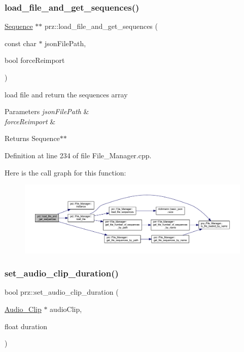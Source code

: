 \subsubsection{\texorpdfstring{load\_file\_and\_get\_sequences()}{load\_file\_and\_get\_sequences()}}
{\footnotesize\ttfamily \mbox{\hyperlink{classprz_1_1_sequence}{Sequence}} $\ast$$\ast$ prz\+::load\+\_\+file\+\_\+and\+\_\+get\+\_\+sequences (\begin{DoxyParamCaption}\item[{const char $\ast$}]{json\+File\+Path,  }\item[{bool}]{force\+Reimport }\end{DoxyParamCaption})}



load file and return the sequences array 


\begin{DoxyParams}{Parameters}
{\em json\+File\+Path} & \\
\hline
{\em force\+Reimport} & \\
\hline
\end{DoxyParams}
\begin{DoxyReturn}{Returns}
Sequence$\ast$$\ast$ 
\end{DoxyReturn}


Definition at line 234 of file File\+\_\+\+Manager.\+cpp.

Here is the call graph for this function\+:
\nopagebreak
\begin{figure}[H]
\begin{center}
\leavevmode
\includegraphics[width=350pt]{namespaceprz_ad91b0a2618b7c9ce3a9bf792a3979e55_cgraph}
\end{center}
\end{figure}
\mbox{\label{namespaceprz_a6f3d46bb8898e0ab0f8200ff01e68b83}} 
\subsubsection{\texorpdfstring{set\_audio\_clip\_duration()}{set\_audio\_clip\_duration()}}
{\footnotesize\ttfamily bool prz\+::set\+\_\+audio\+\_\+clip\+\_\+duration (\begin{DoxyParamCaption}\item[{\mbox{\hyperlink{classprz_1_1_audio___clip}{Audio\+\_\+\+Clip}} $\ast$}]{audio\+Clip,  }\item[{float}]{duration }\end{DoxyParamCaption})}



